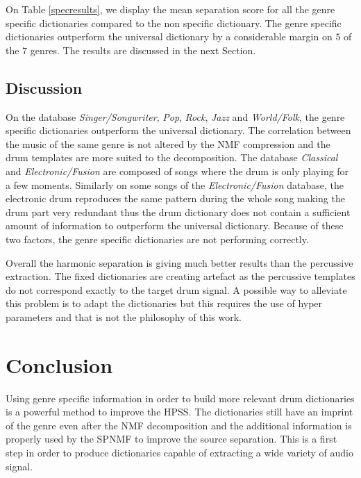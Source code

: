 \documentclass{article}
\begin{document}
On Table \ref{specresults}, we display the mean separation score for all the genre specific dictionaries compared to the non specific dictionary. The genre specific dictionaries outperform the universal dictionary by a considerable margin on $5$ of the $7$ genres. The results are discussed in the next Section.


\subsection{Discussion}


On the database \emph{Singer/Songwriter}, \emph{Pop}, \emph{Rock}, \emph{Jazz} and \emph{World/Folk}, the genre specific dictionaries outperform the universal dictionary. The correlation between the music of the same genre is not altered by the NMF compression and the drum templates are more suited to the decomposition.  
The database \emph{Classical} and \emph{Electronic/Fusion} are composed of songs where the drum is only playing for a few moments. Similarly on some songs of the \emph{Electronic/Fusion} database, the electronic drum reproduces the same pattern during the whole song making the drum part very redundant thus the drum dictionary does not contain a sufficient amount of information to outperform the universal dictionary. Because of these two factors, the genre specific dictionaries are not performing correctly.

Overall the harmonic separation is giving much better results than the percussive extraction. The fixed dictionaries are creating artefact as the percussive templates do not correspond exactly to the target drum signal. A possible way to alleviate this problem is to adapt the dictionaries but this requires the use of hyper parameters and that is not the philosophy of this work.




\section{Conclusion}

Using genre specific information in order to build more relevant drum dictionaries is a powerful method to improve the HPSS. The dictionaries still have an imprint of the genre even after the NMF decomposition and the additional information is properly used by the SPNMF to improve the source separation. This is a first step in order to produce dictionaries capable of extracting a wide variety of audio signal. 
\end{document}
